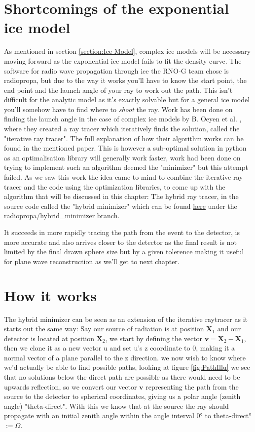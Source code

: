 \documentclass[11pt,a4paper,faculty=we,language=en,doctype=report]{cls/ugent-doc}
\begin{document}
\section{Shortcomings of the exponential ice model}
As mentioned in section \ref{section:Ice Model}, complex ice models will be
necessary moving forward as the exponential ice model fails to fit the density
curve.  The software for radio wave propagation through ice the RNO-G team chose is
radiopropa\cite{Winchen_2019}, but due to the way it works you'll have to know
the start point, the end point and the launch angle of your ray to work out the
path. This isn't difficult for the analytic model as it's exactly solvable but
for a general ice model you'll somehow have to find where to \textit{shoot} the
ray.  Work has been done on finding the launch angle in the case of complex ice
models by B. Oeyen et al. \cite{2022icrc.confE1027O}, where they created a ray
tracer which iteratively finds the solution, called the "iterative ray tracer".
The full explanation of how their algorithm works can be found in the mentioned
paper.  This is however a sub-optimal solution in python as an optimalisation
library will generally work faster, work had been done on trying to implement
such an algorithm deemed the "minimizer" but this attempt failed.  As we saw
this work the idea came to mind to combine the iterative ray tracer and the
code using the optimization libraries, to come up with the algorithm that will
be discussed in this chapter: The hybrid ray tracer, in the source code called
the "hybrid minimizer" which can be found
\href{https://github.com/arthuradriaens-code/NuRadioMC.git}{here} under the
radiopropa/hybrid\_minimizer branch.

It succeeds in more rapidly tracing the path from the event to the detector, is
more accurate and also arrives closer to the detector as the final result is
not limited by the final drawn sphere size but by a given tolerence making it
useful for plane wave reconstruction as we'll get to next chapter.

\section{How it works}
The hybrid minimizer can be seen as an extension of the iterative raytracer
\cite{2022icrc.confE1027O} as it starts out the same way: Say our source of
radiation is at position $\mathbf{X}_1$ and our detector is located at position
$\mathbf{X}_2$, we start by defining the vector $\mathbf{v} = \mathbf{X}_2 -
\mathbf{X}_1$, then we clone it as a new vector u and set u's z coordinate to
0, making it a normal vector of a plane parallel to the z direction. we now
wish to know where we'd actually be able to find possible paths, looking at
figure \ref{fig:PathIllu} we see that no solutions below the direct path are
possible as there would need to be upwards reflection, so we convert our vector
$\mathbf{v}$ representing the path from the source to the detector to spherical
coordinates, giving us a polar angle (zenith angle) "theta-direct". With this
we know that at the source the ray should propagate with an initial zenith
angle within the angle interval 0° to theta-direct° $:= \Omega$.
\end{document}
